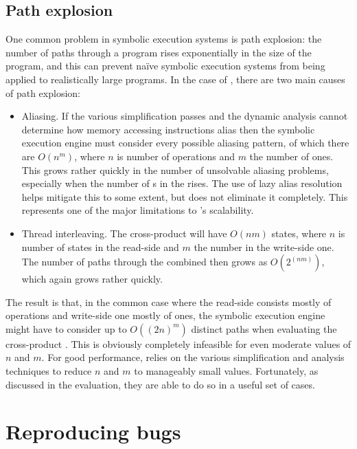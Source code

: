 \subsection{Path explosion}

One common problem in symbolic execution systems is path explosion:
the number of paths through a program rises exponentially in the size
of the program, and this can prevent na\"ive symbolic execution
systems from being applied to realistically large programs.  In the
case of \technique, there are two main causes of path explosion:

\begin{itemize}
\item
  Aliasing.  If the various simplification passes and the dynamic
  analysis cannot determine how memory accessing instructions alias
  then the symbolic execution engine must consider every possible
  aliasing pattern, of which there are $O(n^m)$, where $n$ is number
  of  operations and $m$ the number of  ones.
  This grows rather quickly in the number of unsolvable aliasing
  problems, especially when the number of s in the
  {\StateMachine} rises.  The use of lazy alias resolution helps
  mitigate this to some extent, but does not eliminate it completely.
  This represents one of the major limitations to \technique's
  scalability.
\item
  Thread interleaving.  The cross-product {\StateMachine} will have
  $O(nm)$ states, where $n$ is number of states in the read-side
  {\StateMachine} and $m$ the number in the write-side one.  The
  number of paths through the combined {\StateMachine} then grows as
  $O(2^{(nm)})$, which again grows rather quickly.
\end{itemize}

The result is that, in the common case where the read-side
{\StateMachine} consists mostly of  operations and
write-side one mostly of  ones, the symbolic execution
engine might have to consider up to $O((2n)^m)$ distinct paths when
evaluating the cross-product {\StateMachine}.  This is obviously
completely infeasible for even moderate values of $n$ and $m$.  For
good performance, {\technique} relies on the various simplification
and analysis techniques to reduce $n$ and $m$ to manageably small
values.  Fortunately, as discussed in the evaluation, they are able to
do so in a useful set of cases.

\section{Reproducing bugs}
\label{sect:reproducing_bugs}

